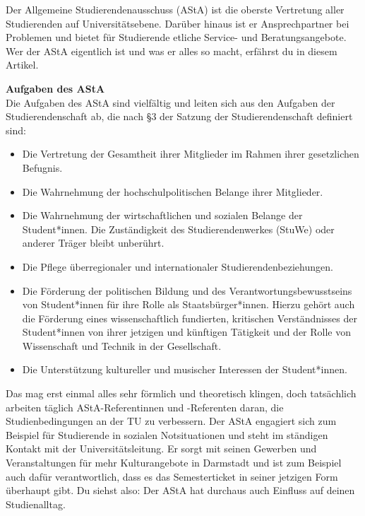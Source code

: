 {Der Allgemeine Studierendenausschuss (AStA) ist die oberste Vertretung aller Studierenden auf Universitätsebene. Darüber hinaus ist er Ansprechpartner bei Problemen und bietet für Studierende etliche Service- und Beratungsangebote.
    Wer der AStA eigentlich ist und was er alles so macht, erfährst du in diesem Artikel.
}{
    \noindent\textbf{Aufgaben des AStA}\\
    Die Aufgaben des AStA sind vielfältig und leiten sich aus den Aufgaben der Studierendenschaft ab, die nach §3 der Satzung der Studierendenschaft definiert sind:

    \begin{itemize}
        \item	Die Vertretung der Gesamtheit ihrer Mitglieder im Rahmen ihrer gesetzlichen Befugnis.
        \item	Die Wahrnehmung der hochschulpolitischen Belange ihrer Mitglieder.
        \item	Die Wahrnehmung der wirtschaftlichen und sozialen Belange der Student*innen. Die Zuständigkeit des Studierendenwerkes (StuWe) oder anderer Träger bleibt unberührt.
        \item	Die Pflege überregionaler und internationaler Studierendenbeziehungen.
        \item	Die Förderung der politischen Bildung und des Verantwortungsbewusstseins von Student*innen für ihre Rolle als Staatsbürger*innen. Hierzu gehört auch die Förderung eines wissenschaftlich fundierten, kritischen Verständnisses der Student*innen von ihrer jetzigen und künftigen Tätigkeit und der Rolle von Wissenschaft und Technik in der Gesellschaft.
        \item	Die Unterstützung kultureller und musischer Interessen der Student*innen.
    \end{itemize}

    Das mag erst einmal alles sehr förmlich und theoretisch klingen, doch tatsächlich arbeiten täglich AStA-Referentinnen und -Referenten daran, die Studienbedingungen an der TU zu verbessern. Der AStA engagiert sich zum Beispiel für Studierende in sozialen Notsituationen und steht im ständigen Kontakt mit der Universitätsleitung. Er sorgt mit seinen Gewerben und Veranstaltungen für mehr Kulturangebote in Darmstadt und ist zum Beispiel auch dafür verantwortlich, dass es das Semesterticket in seiner jetzigen Form überhaupt gibt.
    Du siehst also: Der AStA hat durchaus auch Einfluss auf deinen Studienalltag.\\

}
